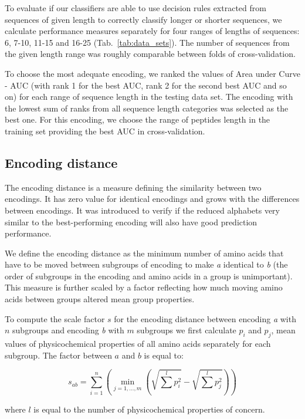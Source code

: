 \documentclass[a4,center,fleqn]{NAR}
\begin{document}
  To evaluate if our classifiers are able to use decision rules extracted from 
sequences of given length to correctly classify longer or shorter sequences, we 
calculate performance measures separately for four ranges of lengths of 
sequences: 6, 7-10, 11-15 and 16-25 (Tab.~\ref{tab:data_sets}). The number of 
sequences from the given length range was roughly comparable between folds of 
cross-validation.
  
  To choose the most adequate encoding, we ranked the values of Area under Curve 
- AUC (with rank 1 for the best AUC, rank 2 for the second best AUC and so on) 
for each range of sequence length in the testing data set. The encoding with the 
lowest sum of ranks from all sequence length categories was selected as the best 
one. For this encoding, we choose the range of peptides length in the training 
set providing the best AUC in cross-validation.

\subsection{Encoding distance}
The encoding distance is a measure defining the similarity between two 
encodings. It has zero value for identical encodings and grows with the 
differences between encodings. It was introduced to verify if the reduced 
alphabets very similar to the best-performing encoding will also have good 
prediction performance.

  We define the encoding distance as the minimum number of amino acids that 
have to be moved between subgroups of encoding to make \textit{a} identical to 
\textit{b} (the order of subgroups in the encoding and amino acids in a group 
is unimportant). This measure is further scaled by a factor reflecting how 
much moving amino acids between groups altered mean group properties. 

To compute the scale factor $s$ for the encoding distance between 
encoding \textit{a} with $n$ subgroups and encoding \textit{b} with $m$ 
subgroups we first calculate $p_i$ and $p_j$, mean values of physicochemical 
properties of all amino acids separately for each subgroup. The factor between 
%
%
%
$a$ and $b$ is equal to: 

$$
s_{ab} = \sum^n_{i = 1}  \left( \min_{j=1,\dots,m} \left(\sqrt{\sum^l p_{i}^2} 
- \sqrt{\sum^l p_{j}^2} \right) \right)
$$
 
where $l$ is equal to the number of physicochemical properties of concern.
\end{document}
